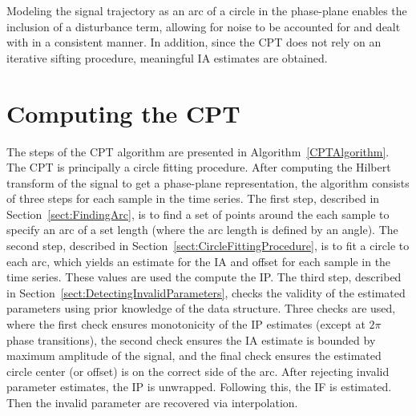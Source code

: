 \documentclass[a4paper]{IEEEtran}
\newcommand{\todo}[1]{\textsf{\emph{\textbf{\textcolor{blue}{#1}}}}}
\begin{document}
Modeling the signal trajectory as an arc of a circle in the phase-plane enables the inclusion of a disturbance term, allowing for noise to be accounted for and dealt with in a consistent manner. In addition, since the CPT does not rely on an iterative sifting procedure, meaningful IA estimates are obtained.



\section{Computing the CPT}\label{sect:ComputingCPTSection}
The steps of the CPT algorithm are presented in Algorithm~\ref{CPTAlgorithm}. The CPT is principally a circle fitting procedure. After computing the Hilbert transform of the signal to get a phase-plane representation, the algorithm consists of three steps for each sample in the time series. 
The first step, described in Section~\ref{sect:FindingArc}, is to find a set of points around the each sample to specify an arc of a set length (where the arc length is defined by an angle). The second step, described in Section~\ref{sect:CircleFittingProcedure}, is to fit a circle to each arc, which yields an estimate for the IA and offset for each sample in the time series. These values are used the compute the IP. The third step, described in Section~\ref{sect:DetectingInvalidParameters}, checks the validity of the estimated parameters using prior knowledge of the data structure. Three checks are used, where the first check ensures monotonicity of the IP estimates (except at $2\pi$ phase transitions), the second check ensures the IA estimate is bounded by maximum amplitude of the signal, and the final check ensures the estimated circle center (or offset) is on the correct side of the arc. After rejecting invalid parameter estimates, the IP is unwrapped. Following this, the IF is estimated. Then the invalid parameter are recovered via interpolation. 
\end{document}
